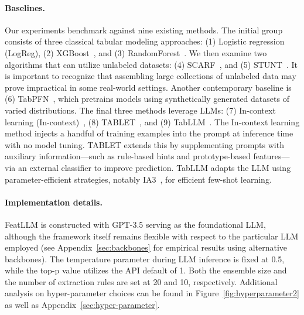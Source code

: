 \vspace*{-0.12in}
\paragraph{Baselines.}
Our experiments benchmark against nine existing methods. The initial group consists of three classical tabular modeling approaches: (1) Logistic regression (LogReg), (2) XGBoost~\cite{chen2016xgboost}, and (3) RandomForest~\cite{ho1995random}. We then examine two algorithms that can utilize unlabeled datasets: (4) SCARF~\cite{bahri2022scarf}, and (5) STUNT~\cite{nam2023stunt}. It is important to recognize that assembling large collections of unlabeled data may prove impractical in some real-world settings. Another contemporary baseline is (6) TabPFN~\cite{hollmann2022tabpfn}, which pretrains models using synthetically generated datasets of varied distributions. The final three methods leverage LLMs: (7) In-context learning (In-context)~\cite{wei2022emergent}, (8) TABLET~\cite{slack2023tablet}, and (9) TabLLM~\cite{hegselmann2023tabllm}. The In-context learning method injects a handful of training examples into the prompt at inference time with no model tuning. TABLET extends this by supplementing prompts with auxiliary information—such as rule-based hints and prototype-based features—via an external classifier to improve prediction. TabLLM adapts the LLM using parameter-efficient strategies, notably IA3~\cite{liu2022few}, for efficient few-shot learning.

\vspace*{-0.12in}
\paragraph{Implementation details.}
\textsf{FeatLLM} is constructed with GPT-3.5 serving as the foundational LLM, although the framework itself remains flexible with respect to the particular LLM employed (see Appendix~\ref{sec:backbones} for empirical results using alternative backbones). The temperature parameter during LLM inference is fixed at 0.5, while the top-p value utilizes the API default of 1. Both the ensemble size and the number of extraction rules are set at 20 and 10, respectively. Additional analysis on hyper-parameter choices can be found in Figure~\ref{fig:hyperparameter2} as well as Appendix~\ref{sec:hyper-parameter}.

